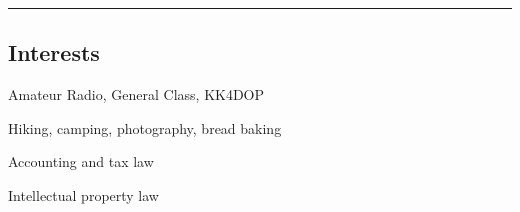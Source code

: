 \documentclass[10pt,letterpaper]{article}
\begin{document}
\hrule
\vspace{-0.4em}
\subsection*{Interests}
\begin{itemize*}
    \item Amateur Radio, General Class, KK4DOP
    \item Hiking, camping, photography, bread baking
    \item Accounting and tax law
    \item Intellectual property law
\end{itemize*}
\end{document}
